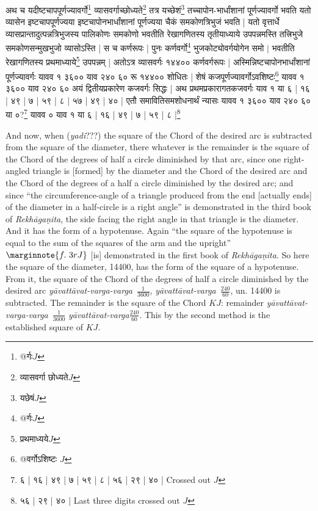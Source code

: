 \documentclass[12pt]{book}
\let\*=\d
\def\RG{\textit{Rekh\=a\-ga\*ni\-ta}}
\def\yava{\textit{y\=avat\-t\=avat-varga}}
\def\yavava{\textit{y\=avat\-t\=avat-varga-varga}}
\begin{document}
\newpage

{\s अथ च यदीष्टचापपूर्णज्यावर्गो\footnote{{\s @र्गः}$J$} व्यासवर्गाच्छोध्यते\footnote{{\s व्यासवर्गा छोध्यते}$J$} तत्र यच्छेशं\footnote{{\s यछेषं}$J$} तच्चापोन-भार्धांशानां पूर्णज्यावर्गो भवति
यतो व्यासेन इष्टचापपूर्णज्यया
इष्टचापोनभार्धांशानां पूर्णज्यया चैकं समकोणत्रिभुजं भवति |
यतो वृत्तार्धे
व्यासप्रान्तादुत्पन्नत्रिभुजस्य पालिकोणः समकोणो भवतीति रेखागणितस्य तृतीयाध्याये उपपन्नमस्ति
तत्त्रिभुजे समकोणसन्मुखभुजो व्यासोऽस्ति | स च कर्णरूपः | पुनः
कर्णवर्गो\footnote{{\s @र्गः}$J$} भुजकोट्योवर्गयोगेन समो $|$ भवतीति रेखागणितस्य
प्रथमाध्याये\footnote{{\s प्रथमाध्यये}$J$} उपपन्नम् | अतोऽत्र व्यासवर्गः १४४०० कर्णवर्गरूपः |
अस्मिन्निष्टचापोन\-भार्धांशानां पूर्णज्यावर्गः यावव १ ३६०० याव २४० ६० रू १४४०० शोधितः | शेषं कजपूर्णज्यावर्गोऽवशिष्टः\footnote{{\s @वर्गोऽशिष्टः} $J$} यावव १ ३६०० याव २४० ६०
अयं द्वितीयप्रकारेण कजवर्गः सिद्धः | अथ प्रथमप्रकारागतकजवर्गः याव १ या ६ | १६ | ४९ | ७ | ५९ | ८ | ५७ | ४९ | ४० |
एतौ समावितिसमशोधनार्थं न्यासः यावव १ ३६०० याव २४० ६०
या ०?\footnote{{\s ६ | १६ | ४९ | ७ | ५९ | ८ | ५६ | २९ | ४० |} Crossed out $J$}
यावव ० याव १ या
६ | १६ | ४९ | ७ | ५९ | ८ |\footnote{ {\s ५६ | २९ | ४० |}  Last three digits crossed out $J$}}

\newpage

And now, when (\textit{yadi}???) the square of the Chord of the desired arc is subtracted from the 
square of the diameter, there whatever is the remainder is the square of 
the Chord of the degrees of half a circle diminished by that arc, since one
right-angled triangle is [formed] by the diameter and the Chord of the 
desired arc and the Chord of the degrees of a half a circle diminished by the
desired arc; and since ``the circumference-angle 
of a triangle produced from the end [actually ends]
of the diameter in a half-circle is a 
right angle'' is demonstrated in the third book of \RG,
the side facing the right angle in that triangle is the diameter. And it 
has the form of a hypotenuse. Again ``the square of the hypotenuse
is equal to the sum of the squares of the arm and the upright''
$\marginnote{f.~3r J}$ [is] demonstrated in the first book  of \RG. So here the square of the diameter, 14400,
has the form of the square of a hypotenuse. From it, the square of the 
Chord of the degrees of half a circle diminished by the desired arc
\yavava\ $\frac{1}{3600}$, \yava\ $\frac{\dot{240}}{60}$, un. 14400 is subtracted.
The remainder is the square of the Chord $KJ$: remainder 
\yavava\ $\frac{\dot{1}}{3600}$ \yava $\frac{240}{60}$. This by the second method
is the established square of $KJ$.
\end{document}
